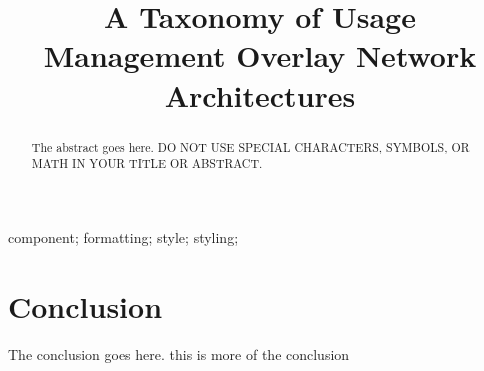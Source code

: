\documentclass[10pt, conference, compsocconf]{IEEEtran}
\begin{document}
\title{A Taxonomy of Usage Management Overlay Network Architectures}

\author{
\and
{}
}

\maketitle


\begin{abstract}
The abstract goes here. DO NOT USE SPECIAL CHARACTERS, SYMBOLS, OR MATH IN YOUR TITLE OR ABSTRACT.

\end{abstract}

\begin{IEEEkeywords}
component; formatting; style; styling;

\end{IEEEkeywords}

\IEEEpeerreviewmaketitle




\section{Conclusion}
The conclusion goes here. this is more of the conclusion



\end{document}
